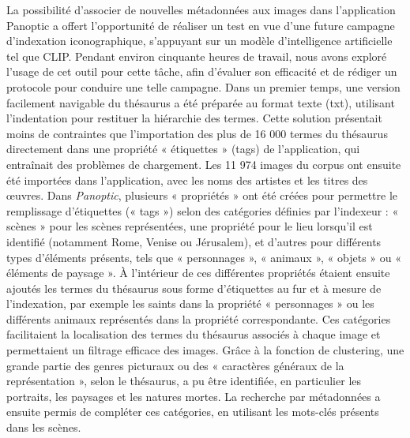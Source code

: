 La possibilité d’associer de nouvelles métadonnées aux images dans l’application Panoptic a offert l’opportunité de réaliser un test en vue d’une future campagne d’indexation iconographique, s’appuyant sur un modèle d’intelligence artificielle tel que CLIP. Pendant environ cinquante heures de travail, nous avons exploré l’usage de cet outil pour cette tâche, afin d’évaluer son efficacité et de rédiger un protocole pour conduire une telle campagne. Dans un premier temps, une version facilement navigable du thésaurus a été préparée au format texte (txt), utilisant l’indentation pour restituer la hiérarchie des termes. Cette solution présentait moins de contraintes que l’importation des plus de 16 000 termes du thésaurus directement dans une propriété « étiquettes » (tags) de l’application, qui entraînait des problèmes de chargement. Les 11 974 images du corpus ont ensuite été importées dans l’application, avec les noms des artistes et les titres des œuvres. Dans \textit{Panoptic}, plusieurs « propriétés » ont été créées pour permettre le remplissage d’étiquettes (« tags ») selon des catégories définies par l’indexeur : « scènes » pour les scènes représentées, une propriété pour le lieu lorsqu’il est identifié (notamment Rome, Venise ou Jérusalem), et d’autres pour différents types d’éléments présents, tels que « personnages », « animaux », « objets » ou « éléments de paysage ». À l’intérieur de ces différentes propriétés étaient ensuite ajoutés les termes du thésaurus sous forme d’étiquettes au fur et à mesure de l’indexation, par exemple les saints dans la propriété « personnages » ou les différents animaux représentés dans la propriété correspondante. Ces catégories facilitaient la localisation des termes du thésaurus associés à chaque image et permettaient un filtrage efficace des images. Grâce à la fonction de clustering, une grande partie des genres picturaux ou des « caractères généraux de la représentation », selon le thésaurus, a pu être identifiée, en particulier les portraits, les paysages et les natures mortes. La recherche par métadonnées a ensuite permis de compléter ces catégories, en utilisant les mots-clés présents dans les scènes. 
	
